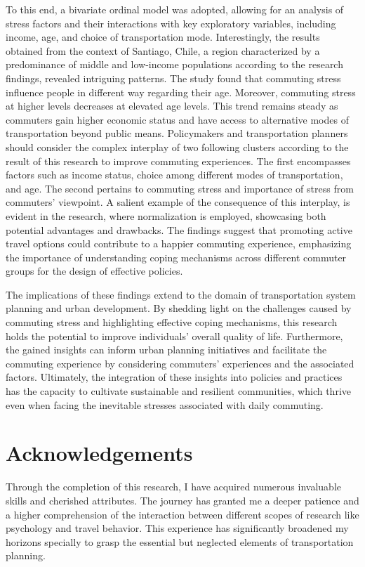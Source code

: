 \documentclass[
11pt, %
oneside, %
english, %
singlespacing, %
]{macthesis} %
\begin{document}
To this end, a bivariate ordinal model was adopted, allowing for an analysis of stress factors and their interactions with key exploratory variables, including income, age, and choice of transportation mode. Interestingly, the results obtained from the context of Santiago, Chile, a region characterized by a predominance of middle and low-income populations according to the research findings, revealed intriguing patterns. The study found that commuting stress influence people in different way regarding their age. Moreover, commuting stress at higher levels decreases at elevated age levels. This trend remains steady as commuters gain higher economic status and have access to alternative modes of transportation beyond public means. Policymakers and transportation planners should consider the complex interplay of two following clusters according to the result of this research to improve commuting experiences. The first encompasses factors such as income status, choice among different modes of transportation, and age. The second pertains to commuting stress and importance of stress from commuters' viewpoint. A salient example of the consequence of this interplay, is evident in the research, where normalization is employed, showcasing both potential advantages and drawbacks. The findings suggest that promoting active travel options could contribute to a happier commuting experience, emphasizing the importance of understanding coping mechanisms across different commuter groups for the design of effective policies.

The implications of these findings extend to the domain of transportation system planning and urban development. By shedding light on the challenges caused by commuting stress and highlighting effective coping mechanisms, this research holds the potential to improve individuals' overall quality of life. Furthermore, the gained insights can inform urban planning initiatives and facilitate the commuting experience by considering commuters' experiences and the associated factors. Ultimately, the integration of these insights into policies and practices has the capacity to cultivate sustainable and resilient communities, which thrive even when facing the inevitable stresses associated with daily commuting.
\clearpage


\section*{Acknowledgements}
  Through the completion of this research, I have acquired numerous invaluable skills and cherished attributes. The journey has granted me a deeper patience and a higher comprehension of the interaction between different scopes of research like psychology and travel behavior. This experience has significantly broadened my horizons specially to grasp the essential but neglected elements of transportation planning.
\end{document}
